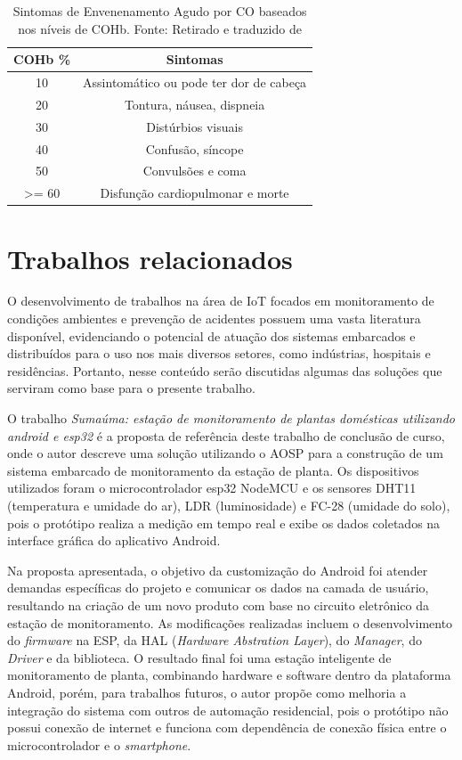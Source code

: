 \begin{table}[h!]
    \centering
    \begin{tabular}{|c|c|}
        \hline
        \textbf{COHb \%} & \textbf{Sintomas} \\
        \hline
        10 & Assintomático ou pode ter dor de cabeça \\
        \hline
        20 & Tontura, náusea, dispneia \\
        \hline
        30 & Distúrbios visuais \\
        \hline
        40 & Confusão, síncope \\
        \hline
        50 & Convulsões e coma \\
        \hline
        >= 60 & Disfunção cardiopulmonar e morte \\
        \hline
    \end{tabular}
    \caption{Sintomas de Envenenamento Agudo por CO baseados nos níveis de COHb. Fonte: Retirado e traduzido de \cite{carbon-monoxide-poisoning-varon}}
\end{table}

\section{Trabalhos relacionados}

O desenvolvimento de trabalhos na área de IoT focados em monitoramento de condições ambientes e prevenção de acidentes 
possuem uma vasta literatura disponível, evidenciando o potencial de atuação dos sistemas embarcados e distribuídos para 
o uso nos mais diversos setores, como indústrias, hospitais e residências. Portanto, nesse conteúdo  serão discutidas 
algumas das soluções que serviram como base para o presente trabalho. 

O trabalho \textit{Sumaúma: estação de monitoramento de plantas domésticas utilizando android e esp32} \cite{ufam-aosp-sumama} é a proposta de 
referência deste trabalho de conclusão de curso, onde o autor descreve uma solução utilizando o AOSP para a construção de um 
sistema embarcado de monitoramento da estação de planta. Os dispositivos utilizados foram o microcontrolador esp32 NodeMCU e os sensores DHT11 (temperatura e umidade do ar), LDR 
(luminosidade) e FC-28 (umidade do solo), pois o protótipo realiza a medição em tempo real e exibe os dados coletados na interface gráfica do aplicativo Android. 

Na proposta apresentada, o objetivo da customização do Android foi atender demandas específicas do projeto e comunicar os dados na camada de usuário, resultando na criação de um novo produto com base no 
circuito eletrônico da estação de monitoramento.  As modificações realizadas incluem o desenvolvimento do \textit{firmware} na ESP, 
da HAL (\textit{Hardware Abstration Layer}), do \textit{Manager}, do \textit{Driver} e da biblioteca. O resultado final foi uma estação inteligente de monitoramento 
de planta, combinando hardware e software dentro da plataforma Android, porém, para trabalhos futuros, o autor propõe como melhoria a integração do sistema 
com outros de automação residencial, pois o protótipo não possui conexão de internet e funciona com dependência de conexão física 
entre o microcontrolador e o \textit{smartphone}.

